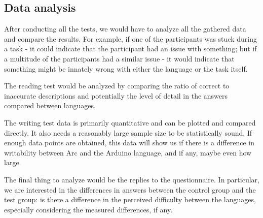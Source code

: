 \subsection{Data analysis}\label{subsubsec:analysisOfTheData}
After conducting all the tests, we would have to analyze all the gathered data and compare the results. For example, if one of the participants was stuck during a task - it could indicate that the participant had an issue with something; but if a multitude of the participants had a similar issue - it would indicate that something might be innately wrong with either the language or the task itself.

The reading test would be analyzed by comparing the ratio of correct to inaccurate descriptions and potentially the level of detail in the answers compared between languages. 

The writing test data is primarily quantitative and can be plotted and compared directly. It also needs a reasonably large sample size to be statistically sound. If enough data points are obtained, this data will show us if there is a difference in writability between Arc and the Arduino language, and if any, maybe even how large.  

The final thing to analyze would be the replies to the questionnaire. In particular, we are interested in the differences in answers between the control group and the test group: is there a difference in the perceived difficulty between the languages, especially considering the measured differences, if any.
